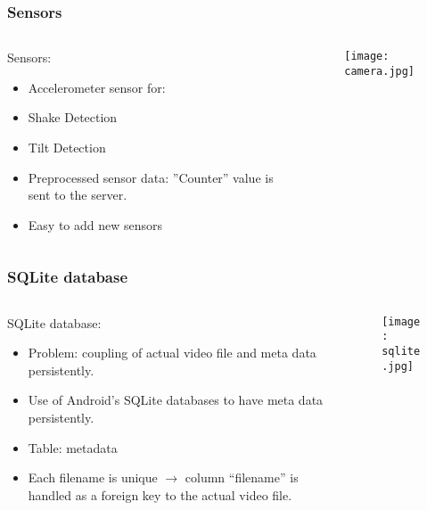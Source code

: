 \begin{frame}	
	\frametitle{Sensors}
	\begin{columns}[t]
		\begin{column}[t]{0.5\linewidth}
			Sensors:
			\begin{itemize}
				\item Accelerometer sensor for:
				\item Shake Detection
				\item Tilt Detection
				\item Preprocessed sensor data: ”Counter” value is sent to the server.
				\item Easy to add new sensors
			\end{itemize}
		\end{column}
		\begin{column}[t]{0.5\linewidth}
			\begin{figure}[!t]
				\centering
				\texttt{[image: camera.jpg]}
				\label{fig:gen_arch}
			\end{figure}
		\end{column}				
	\end{columns}	
\end{frame}

\begin{frame}	
	\frametitle{SQLite database}
	\begin{columns}[t]
		\begin{column}[t]{0.5\linewidth}
			SQLite database:
				\begin{itemize}
					\item Problem: coupling of actual video file and meta data persistently. 
					\item Use of Android's SQLite databases to have meta data persistently.
					\item Table: metadata
					\item Each filename is unique $\rightarrow$ column ``filename'' is handled as a foreign key to the actual video file.
				\end{itemize}
		\end{column}
		\begin{column}[t]{0.5\linewidth}
			\begin{figure}[!t]
				\centering
				\texttt{[image: sqlite.jpg]}
				\label{fig:gen_arch}
			\end{figure}
		\end{column}
	\end{columns}		
\end{frame}

